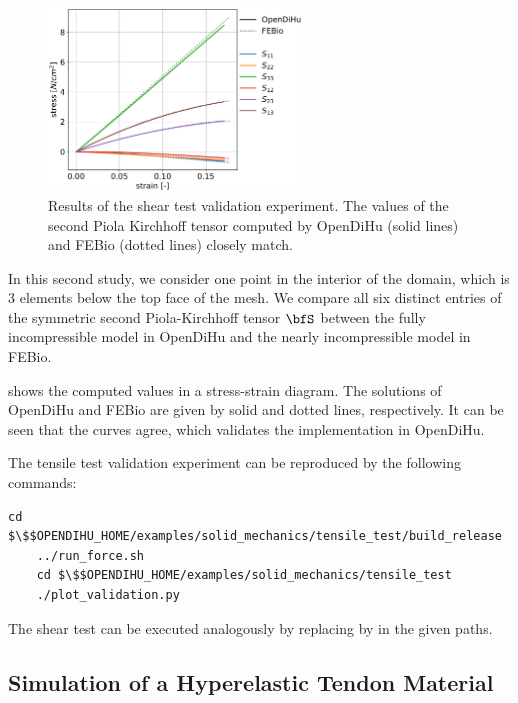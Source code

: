 \begin{figure}
  \centering%
  \includegraphics[width=0.6\textwidth]{images/results/basic/validation_shear_test.pdf}%
  \caption{Results of the shear test validation experiment. The values of the second Piola Kirchhoff tensor computed by OpenDiHu (solid lines) and FEBio (dotted lines) closely match.}%
  \label{fig:validation_shear_test}%
\end{figure}

In this second study, we consider one point in the interior of the domain, which is 3 elements below the top face of the mesh. We compare all six distinct entries of the symmetric second Piola-Kirchhoff tensor $\bfS$ between the fully incompressible model in OpenDiHu and the nearly incompressible model in FEBio. 

 shows the computed values in a stress-strain diagram. The solutions of OpenDiHu and FEBio are given by solid and dotted lines, respectively. It can be seen that the curves agree, which validates the implementation in OpenDiHu.

\begin{reproduce_no_break}
  The tensile test validation experiment can be reproduced by the following commands:
  \begin{lstlisting}[columns=fullflexible,breaklines=true,postbreak=\mbox{\textcolor{gray}{$\hookrightarrow$}\space}]
    cd $\$$OPENDIHU_HOME/examples/solid_mechanics/tensile_test/build_release
    ../run_force.sh
    cd $\$$OPENDIHU_HOME/examples/solid_mechanics/tensile_test
    ./plot_validation.py
  \end{lstlisting}
  The shear test can be executed analogously by replacing  by  in the given paths.
\end{reproduce_no_break}

\subsection{Simulation of a Hyperelastic Tendon Material}\label{sec:simulation_hyperelastic_tendon}

